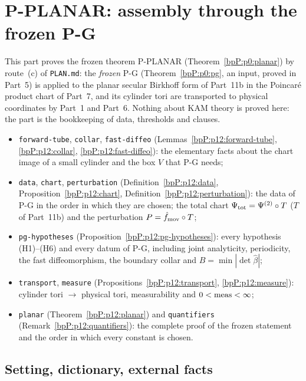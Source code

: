 \section{P-PLANAR: assembly through the frozen P-G}\label{bpP:p12}
\begingroup\sloppy

This part proves the frozen theorem P-PLANAR (Theorem~\ref{bpP:p0:planar}) by route~(c) of \texttt{PLAN.md}: the \emph{frozen} P-G (Theorem~\ref{bpP:p0:pg}, an input, proved in Part~5) is applied to the planar secular Birkhoff form of Part~11b in the Poincar\'e product chart of Part~7, and its cylinder tori are transported to physical coordinates by Part~1 and Part~6. Nothing about KAM theory is proved here: the part is the bookkeeping of data, thresholds and clauses.
\begin{itemize}
\item \texttt{forward-tube}, \texttt{collar}, \texttt{fast-diffeo} (Lemmas~\ref{bpP:p12:forward-tube}, \ref{bpP:p12:collar}, \ref{bpP:p12:fast-diffeo}): the elementary facts about the chart image of a small cylinder and the box $V$ that P-G needs;
\item \texttt{data}, \texttt{chart}, \texttt{perturbation} (Definition~\ref{bpP:p12:data}, Proposition~\ref{bpP:p12:chart}, Definition~\ref{bpP:p12:perturbation}): the data of P-G in the order in which they are chosen; the total chart $\Psi_{\rm tot}=\Psi^{(2)}\circ T$ ($T$ of Part~11b) and the perturbation $P=\hat f_{\rm mov}\circ T$;
\item \texttt{pg-hypotheses} (Proposition~\ref{bpP:p12:pg-hypotheses}): every hypothesis (H1)--(H6) and every datum of P-G, including joint analyticity, periodicity, the fast diffeomorphism, the boundary collar and $B=\min|\det\hat\beta|$;
\item \texttt{transport}, \texttt{measure} (Propositions~\ref{bpP:p12:transport}, \ref{bpP:p12:measure}): cylinder tori $\to$ physical tori, measurability and $0<\operatorname{meas}<\infty$;
\item \texttt{planar} (Theorem~\ref{bpP:p12:planar}) and \texttt{quantifiers} (Remark~\ref{bpP:p12:quantifiers}): the complete proof of the frozen statement and the order in which every constant is chosen.
\end{itemize}

\subsection{Setting, dictionary, external facts}\label{bpP:p12:sec-set}

